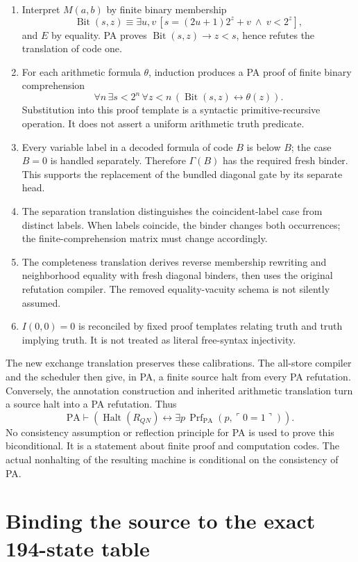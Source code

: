 \documentclass[11pt,letterpaper]{article}
\newcommand{\PA}{\mathrm{PA}}
\newcommand{\Halt}{\operatorname{Halt}}
\newcommand{\Prf}{\operatorname{Prf}}
\begin{document}
\begin{enumerate}
\item Interpret $M(a,b)$ by finite binary membership
\[
\operatorname{Bit}(s,z)\equiv
\exists u,v\,[s=(2u+1)2^z+v\ \wedge\ v<2^z],
\]
and $E$ by equality. PA proves $\operatorname{Bit}(s,z)\to z<s$,
hence refutes the translation of code one.
\item For each arithmetic formula $\theta$, induction produces a PA proof
of finite binary comprehension
\[
\forall n\,\exists s<2^n\,\forall z<n\,
(\operatorname{Bit}(s,z)\leftrightarrow\theta(z)).
\]
Substitution into this proof template is a syntactic primitive-recursive
operation. It does not assert a uniform arithmetic truth predicate.
\item Every variable label in a decoded formula of code $B$ is below $B$;
the case $B=0$ is handled separately. Therefore $\Gamma(B)$ has the
required fresh binder. This supports the replacement of the bundled
diagonal gate by its separate head.
\item The separation translation distinguishes the coincident-label case
from distinct labels. When labels coincide, the binder changes both
occurrences; the finite-comprehension matrix must change accordingly.
\item The completeness translation derives reverse membership rewriting
and neighborhood equality with fresh diagonal binders, then uses the
original refutation compiler. The removed equality-vacuity schema is not
silently assumed.
\item $I(0,0)=0$ is reconciled by fixed proof templates relating truth and
truth implying truth. It is not treated as literal free-syntax injectivity.
\end{enumerate}

The new exchange translation preserves these calibrations. The all-store
compiler and the scheduler then give, in PA, a finite source halt from
every PA refutation. Conversely, the annotation construction and inherited
arithmetic translation turn a source halt into a PA refutation. Thus
\[
\PA\vdash\left(\Halt(R_{QN})\leftrightarrow
          \exists p\,\Prf_{\PA}(p,\ulcorner0=1\urcorner)\right).
\]
No consistency assumption or reflection principle for PA is used to prove
this biconditional. It is a statement about finite proof and computation
codes. The actual nonhalting of the resulting machine is conditional on
the consistency of PA.

\section{Binding the source to the exact 194-state table}
\label{sec:physical}
\end{document}
